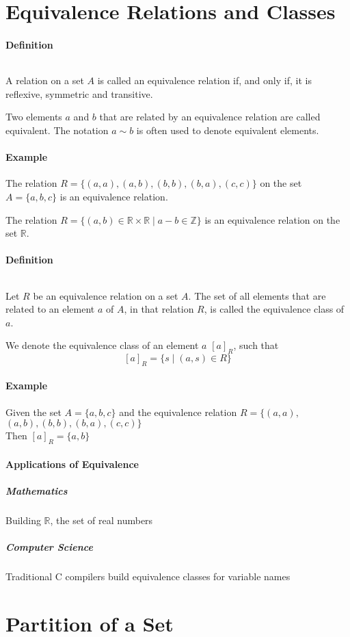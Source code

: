 \documentclass[10pt,a4paper]{book}
\newcommand{\R}{\mathbb{R}}
\begin{document}
\section{Equivalence Relations and Classes}
\paragraph*{Definition}
$\ $\par
A relation on a set $A$ is called an equivalence relation if, and only if, it is reflexive, symmetric and transitive.\par
Two elements $a$ and $b$ that are related by an equivalence relation are called equivalent. The notation $a \sim b$ is often used to denote equivalent elements.
\paragraph*{Example}
The relation $R = \{(a,a),(a,b),(b,b),(b,a),(c,c)\}$ on the set $A = \{a,b,c\}$ is an equivalence relation.\par
The relation $R = \{(a,b) \in \R \times \R \mid a - b \in \mathbb{Z}\}$ is an equivalence relation on the set $\mathbb{R}$.
\paragraph*{Definition}
$\ $\par
Let $R$ be an equivalence relation on a set $A$. The set of all elements that are related to an element $a$ of $A$, in that relation $R$, is called the equivalence class of $a$.\par
We denote the equivalence class of an element $a$  $[a]_R$, such that \[[a]_R = \{s \mid (a,s) \in R\}\]
\paragraph*{Example}
Given the set $A = \{a,b,c\}$ and the equivalence relation $R = \{(a,a),$\\$(a,b),(b,b),(b,a),(c,c)\}$\\
Then $[a]_R = \{a,b\}$
\paragraph*{Applications of Equivalence}
\subparagraph*{Mathematics}
Building $\mathbb{R}$, the set of real numbers
\subparagraph*{Computer Science}
Traditional C compilers build equivalence classes for variable names

\section{Partition of a Set}
\end{document}
